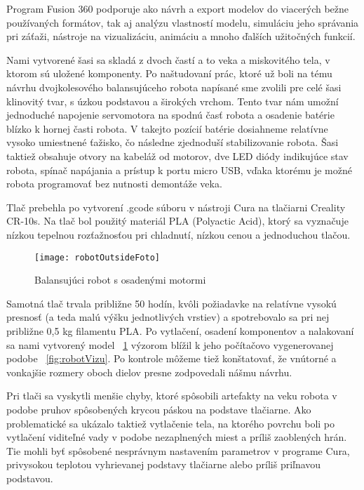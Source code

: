Program Fusion 360 podporuje ako návrh a export modelov do viacerých bežne používaných formátov, tak aj analýzu vlastností modelu, simuláciu jeho správania pri záťaži, nástroje na vizualizáciu, animáciu a mnoho ďalších užitočných funkcií.

Nami vytvorené šasi  sa skladá z dvoch častí a to veka a miskovitého tela, v ktorom sú uložené komponenty. Po naštudovaní prác, ktoré už boli na tému návrhu dvojkolesového balansujúceho robota napísané sme zvolili pre celé šasi klinovitý tvar, s úzkou podstavou a širokých vrchom. Tento tvar nám umožní jednoduché napojenie servomotora na spodnú časť robota a osadenie batérie blízko k hornej časti robota. V takejto pozícií batérie dosiahneme relatívne vysoko umiestnené ťažisko, čo následne zjednoduší stabilizovanie robota. Šasi taktiež obsahuje otvory na kabeláž od motorov, dve LED diódy indikujúce stav robota, spínač napájania a prístup k portu micro USB, vďaka ktorému je možné robota programovať bez nutnosti demontáže veka.

Tlač prebehla po vytvorení .gcode súboru v nástroji Cura na tlačiarni Creality CR-10s. Na tlač bol použitý materiál PLA (Polyactic Acid), ktorý sa vyznačuje nízkou tepelnou rozťažnosťou pri chladnutí, nízkou cenou a jednoduchou tlačou. 

\begin{figure}
\centering
\texttt{[image: robotOutsideFoto]}
\caption{Balansujúci robot s osadenými motormi}
\label{fig:robotOutsideFoto}
\end{figure}

Samotná tlač trvala približne 50 hodín, kvôli požiadavke na relatívne vysokú presnosť (a teda malú výšku jednotlivých vrstiev) a spotrebovalo sa pri nej približne 0,5 kg filamentu PLA. Po vytlačení, osadení komponentov a nalakovaní sa nami vytvorený model \figurename~\ref{fig:robotOutsideFoto} výzorom blížil k jeho počítačovo vygenerovanej podobe \figurename~\ref{fig:robotVizu}. Po kontrole môžeme tiež konštatovať, že vnútorné a vonkajšie rozmery oboch dielov presne zodpovedali nášmu návrhu.

Pri tlači sa vyskytli menšie chyby, ktoré spôsobili artefakty na veku robota v podobe pruhov spôsobených krycou páskou na podstave tlačiarne. Ako problematické sa ukázalo taktiež vytlačenie tela, na ktorého povrchu boli po vytlačení viditeľné vady v podobe nezaplnených miest a príliš zaoblených hrán. Tie mohli byť spôsobené nesprávnym nastavením parametrov v programe Cura, privysokou teplotou vyhrievanej podstavy tlačiarne alebo príliš priľnavou podstavou. 

